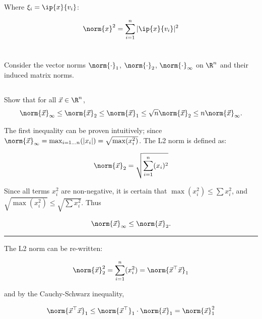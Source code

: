 \documentclass{template}
\begin{document}
Where $\xi_i = \ip{x}{v_i}$:

\begin{equation}
    \norm{x}^2 = \sum_{i=1}^n |\ip{x}{v_i}|^2
\end{equation}

\newpage
\section{}

Consider the vector norms $\norm{\cdot}_1$, 
$\norm{\cdot}_2$, $\norm{\cdot}_\infty$ on $\R^n$ and their induced matrix norms. 



\subsection{}\label{sec:l2_vec_inequalities}

Show that for all $\vec{x} \in \R^n$,
\[
\norm{\vec{x}}_\infty \leq \norm{\vec{x}}_2 \leq \norm{\vec{x}}_1 \leq \sqrt{n}\norm{\vec{x}}_2 \leq n \norm{\vec{x}}_\infty.
\]

The first inequality can be proven intuitively; since $\norm{\vec{x}}_\infty = \max_{i=1\dots n} (|x_i|) = \sqrt{\max(x_i^2)}$. The L2 norm is defined as:

\begin{equation}
    \norm{\vec{x}}_2 = \sqrt{\sum_{i=1}^n (x_i)^2}
\end{equation}

Since all terms $x_i^2$ are non-negative, it is certain that $\max (x_i^2) \leq\sum x_i^2$, and $\sqrt{\max (x_i^2)} \leq\sqrt{\sum x_i^2}$. Thus

\begin{equation}\label{eq:first_norm_inequality}
    \norm{\vec{x}}_\infty \leq \norm{\vec{x}}_2.
\end{equation}

\hrule

The L2 norm can be re-written:

\begin{equation}
    \norm{\vec{x}}_2^2 = \sum_{i=1}^n (x_i^2) = \norm{\vec{x}^\top\vec{x}}_1
\end{equation}

and by the Cauchy-Schwarz inequality,

\begin{equation}
    \norm{\vec{x}^\top\vec{x}}_1 \leq \norm{\vec{x}^\top}_1 \cdot \norm{\vec{x}}_1 = \norm{\vec{x}}_1^2
\end{equation}
\end{document}
